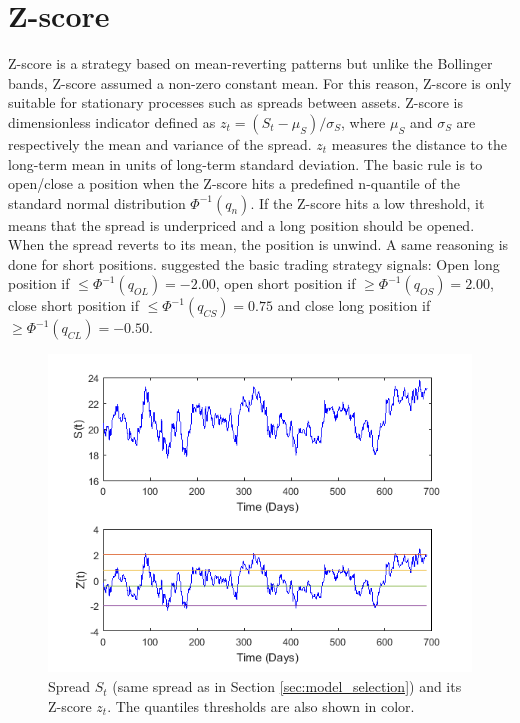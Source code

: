 \documentclass[11pt,a4,twosided,singlespacing,titlepagenumber=on]{scrreprt}
\numberwithin{equation}{chapter} %
\theoremstyle{remark}
\begin{document}
\section{Z-score}
Z-score is a strategy based on mean-reverting patterns but unlike the Bollinger bands, Z-score assumed a non-zero constant mean. For this reason, Z-score is only suitable for stationary processes such as spreads between assets. Z-score is dimensionless indicator defined as $z_t = (S_t-\mu_S) / \sigma_S$, where $\mu_S$ and $\sigma_S$ are respectively the mean and variance of the spread. $z_t$ measures the distance to the long-term mean in units of long-term standard deviation. The basic rule is to open/close a position when the Z-score hits a predefined n-quantile of the standard normal distribution $\Phi^{-1}(q_n)$. If the Z-score hits a low threshold, it means that the spread is underpriced and a long position should be opened. When the spread reverts to its mean, the position is unwind. A same reasoning is done for short positions. \cite{caldeira2013} suggested the basic trading strategy signals: Open long position if $\leq \Phi^{-1}(q_{OL}) = -2.00$, open short position if $\geq \Phi^{-1}(q_{OS}) = 2.00$, close short position if $\leq \Phi^{-1}(q_{CS}) = 0.75$ and close long position if $\geq \Phi^{-1}(q_{CL}) = -0.50$.

\begin{figure}[H]
\centering
\includegraphics[width = 1\textwidth]{zscore/zscore1}
\caption{Spread $S_t$ (same spread as in Section \ref{sec:model_selection}) and its Z-score $z_t$. The quantiles thresholds are also shown in color.}
\label{dist_100_r2_quad}
\end{figure}
\end{document}
